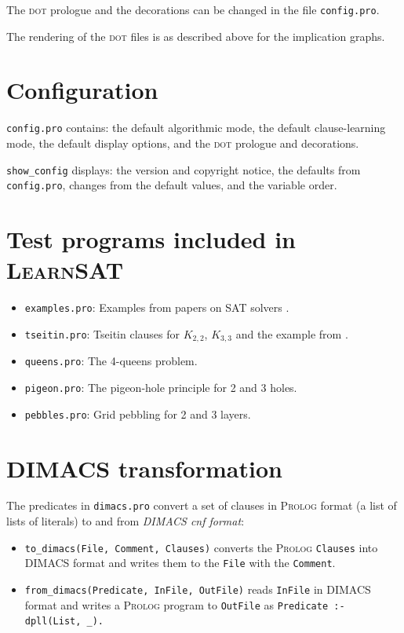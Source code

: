 \documentclass[11pt]{article}
\newcommand*{\p}[1]{\textup{\texttt{#1}}}
\newcommand*{\ls}{\textsc{LearnSAT}}
\newcommand*{\pl}{\textsc{Prolog}}
\newcommand*{\dt}{\textsc{dot}}
\begin{document}
The \dt{} prologue and the decorations can be changed in the file
\p{config.pro}.

The rendering of the \dt{} files is as described above for the
implication graphs.


\newpage

\section{Configuration}

\p{config.pro} contains: the default algorithmic mode, the default
clause-learning mode, the default display options, and the \dt{}
prologue and decorations.

\p{show\_config} displays: the version and copyright notice, the
defaults from \p{config.pro}, changes from the default values, and the
variable order.


\section{Test programs included in \ls{}}

\begin{itemize}
\item \p{examples.pro}: Examples from papers on SAT
solvers \cite{mz,mlm,ms}.

\item \p{tseitin.pro}: Tseitin clauses for $K_{2,2}$,
$K_{3,3}$ and the example from \cite[Section 4.5]{mlcs}.

\item \p{queens.pro}: The 4-queens problem.

\item \p{pigeon.pro}: The pigeon-hole principle for 2 and 3 holes.

\item \p{pebbles.pro}: Grid pebbling for 2 and 3 layers.
\end{itemize}

\section{DIMACS transformation}

The predicates in \p{dimacs.pro} convert a set of clauses in
\pl{} format (a list of lists of literals) to and from \emph{DIMACS cnf
format}:
\begin{itemize}
\item \p{to\_dimacs(File, Comment, Clauses)} converts the \pl{}
\p{Clauses} into DIMACS format and writes them to the \p{File} with the
\p{Comment}.
\item \p{from\_dimacs(Predicate, InFile, OutFile)} reads \p{InFile} in
DIMACS format and writes a \pl{} program to \p{OutFile} as
\verb+Predicate :- dpll(List, _).+
\end{itemize}
\end{document}
